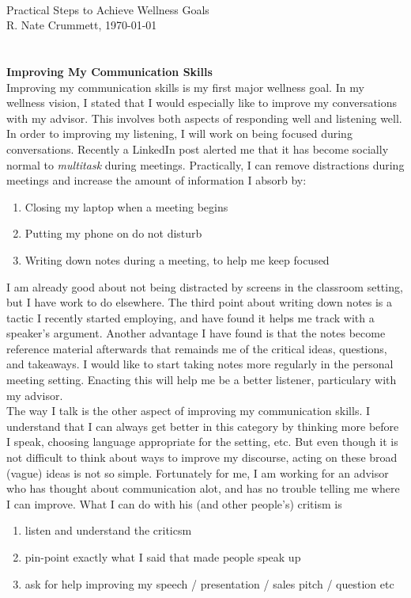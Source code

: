 \documentclass[12pt]{article}
\renewcommand{\title}
{
  \noindent {\LARGE Action Plan} \\
  {\normalsize Practical Steps to Achieve Wellness Goals} \\
  {\small R. Nate Crummett, \today} \\
  \noindent \makebox[\linewidth]{\rule{\textwidth}{0.8pt}} \\ %
}
\newcommand{\sectiontitle}[1]{ \noindent \textbf{\large #1} \\[-4mm] }
\begin{document}
  \title \\ [-1mm]  
  \sectiontitle{Improving My Communication Skills}

  Improving my communication skills is my first major wellness goal. In my wellness
  vision, I stated that I would especially like to improve my conversations with my advisor.
  This involves both aspects of responding well and listening well. \\

  In order to improving my listening, I will work on being focused during conversations.
  Recently a LinkedIn post alerted me that it has become socially normal to
  \textit{multitask} during meetings. Practically, I can remove distractions during meetings
  and increase the amount of information I absorb by:

  \begin{enumerate}
    \item Closing my laptop when a meeting begins
    \item Putting my phone on do not disturb
    \item Writing down notes during a meeting, to help me keep focused
  \end{enumerate}

  I am already good about not being distracted by screens in the classroom setting, but I have work
  to do elsewhere. The third point about writing down notes is a tactic I recently started employing,
  and have found it helps me track with a speaker's argument. Another advantage I have found is that
  the notes become reference material afterwards that remainds me of the critical ideas, questions,
  and takeaways. I would like to start taking notes more regularly in the personal
  meeting setting. Enacting this will help me be a better listener, particulary with my
  advisor. \\

  The way I talk is the other aspect of improving my communication skills. I understand that I can
  always get better in this category by thinking more before I speak, choosing language appropriate
  for the setting, etc. But even though it is not difficult to think about ways to improve
  my discourse, acting on these broad (vague) ideas is not so simple. Fortunately for me, I am
  working for an advisor who has thought about communication alot, and has no trouble telling me
  where I can improve. What I can do with his (and other people's) critism is \\
  \pagebreak
  \begin{enumerate}
    \item listen and understand the criticsm
    \item pin-point exactly what I said that made people speak up
    \item ask for help improving my speech / presentation / sales pitch / question etc
  \end{enumerate}
\end{document}
